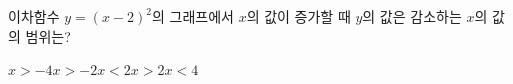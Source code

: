 이차함수 $y=(x-2)^2$의 그래프에서 $x$의 값이 증가할 때 $y$의 값은 감소하는 $x$의 값의 범위는?
\begin{choices32}{$x>-4$}{$x>-2$}{$x<2$}{$x>2$}{$x<4$}\end{choices32}
